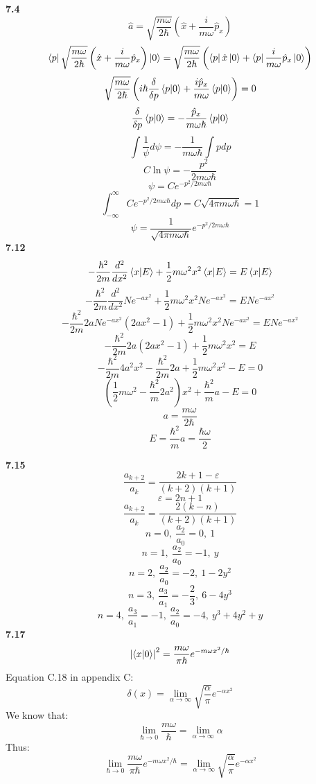 \documentclass[english]{article}
\begin{document}
\begin{multicols}{2}
\noindent
\textbf{7.4}
$$\hat{a}=\sqrt{\frac{m\omega}{2\hbar}}\left(\hat{x}+\frac{i}{m\omega}\hat{p}_x\right)$$
$$\bra{p}\sqrt{\frac{m\omega}{2\hbar}}\left(\hat{x}+\frac{i}{m\omega}\hat{p}_x\right)\ket{0}=\sqrt{\frac{m\omega}{2\hbar}}\left(\bra{p}\hat{x}\ket{0}+\bra{p}\frac{i}{m\omega}\hat{p}_x\ket{0}\right)$$
$$\sqrt{\frac{m\omega}{2\hbar}}\left(i\hbar\frac{\delta}{\delta p}\bra{p}\ket{0}+\frac{i\hat{p}_x}{m\omega}\bra{p}\ket{0}\right)=0$$
$$\frac{\delta}{\delta p}\bra{p}\ket{0}=-\frac{\hat{p}_x}{m\omega\hbar}\bra{p}\ket{0}$$
$$\int\frac{1}{\psi}d\psi=-\frac{1}{m\omega\hbar}\int pdp$$
$$C\ln\psi=-\frac{p^2}{2m\omega\hbar}$$
$$\psi=Ce^{-p^2/2m\omega\hbar}$$
$$\int_{-\infty}^{\infty}Ce^{-p^2/2m\omega\hbar}dp=C\sqrt{4\pi m\omega\hbar}=1$$
$$\psi=\frac{1}{\sqrt{4\pi m\omega\hbar}}e^{-p^2/2m\omega\hbar}$$
\noindent
\textbf{7.12}
$$-\frac{\hbar^2}{2m}\frac{d^2}{dx^2}\bra{x}\ket{E}+\frac{1}{2}m\omega^2x^2\bra{x}\ket{E}=E\bra{x}\ket{E}$$
$$-\frac{\hbar^2}{2m}\frac{d^2}{dx^2}Ne^{-ax^2}+\frac{1}{2}m\omega^2x^2Ne^{-ax^2}=ENe^{-ax^2}$$
$$-\frac{\hbar^2}{2m}2aNe^{-a x^2}\left(2ax^2-1\right)+\frac{1}{2}m\omega^2x^2Ne^{-ax^2}=ENe^{-ax^2}$$
$$-\frac{\hbar^2}{2m}2a\left(2ax^2-1\right)+\frac{1}{2}m\omega^2x^2=E$$
$$-\frac{\hbar^2}{2m}4a^2x^2-\frac{\hbar^2}{2m}2a+\frac{1}{2}m\omega^2x^2-E=0$$
$$\left(\frac{1}{2}m\omega^2-\frac{\hbar^2}{m}2a^2\right)x^2+\frac{\hbar^2}{m}a-E=0$$
$$a=\frac{m\omega}{2\hbar}$$
$$E=\frac{\hbar^2}{m}a=\frac{\hbar\omega}{2}$$
\end{multicols}
\noindent
\textbf{7.15}
$$\frac{a_{k+2}}{a_k}=\frac{2k+1-\varepsilon}{\left(k+2\right)\left(k+1\right)}$$
$$\varepsilon=2n+1$$
$$\frac{a_{k+2}}{a_k}=\frac{2\left(k-n\right)}{\left(k+2\right)\left(k+1\right)}$$
$$n=0,\ \frac{a_2}{a_0}=0,\ 1$$
$$n=1,\ \frac{a_2}{a_0}=-1,\ y$$
$$n=2,\ \frac{a_2}{a_0}=-2,\ 1-2y^2$$
$$n=3,\ \frac{a_3}{a_1}=-\frac{2}{3},\ 6-4y^3$$
$$n=4,\ \frac{a_3}{a_1}=-1,\ \frac{a_2}{a_0}=-4,\ y^3+4y^2+y$$
\noindent
\textbf{7.17}
$$\left|\bra{x}\ket{0}\right|^2=\frac{m\omega}{\pi\hbar}e^{-m\omega x^2/\hbar}$$
Equation C.18 in appendix C:
$$\delta\left(x\right)=\lim_{\alpha\rightarrow\infty}\sqrt{\frac{\alpha}{\pi}}e^{-\alpha x^2}$$
We know that:
$$\lim_{\hbar\rightarrow 0}\frac{m\omega}{\hbar}=\lim_{\alpha\rightarrow\infty}\alpha$$
Thus:
$$\lim_{\hbar\rightarrow 0}\frac{m\omega}{\pi\hbar}e^{-m\omega x^2/\hbar}=\lim_{\alpha\rightarrow\infty}\sqrt{\frac{\alpha}{\pi}}e^{-\alpha x^2}$$
\end{document}
